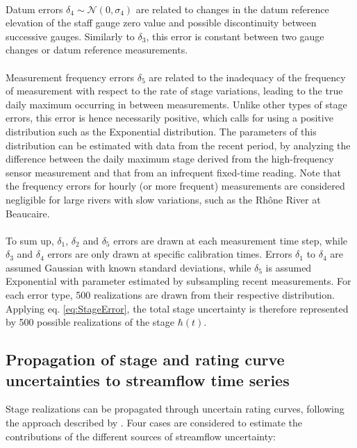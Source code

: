     \paragraph{}Datum errors $\delta_4  \sim \mathcal{N}(0,\sigma_4)$ are related to changes in the datum reference elevation of the staff gauge zero value and possible discontinuity between successive gauges. Similarly to $\delta_3$, this error is constant between two gauge changes or datum reference measurements. 
    
    \paragraph{}Measurement frequency errors $\delta_5$ are related to the inadequacy of the frequency of measurement with respect to the rate of stage variations, leading to the true daily maximum occurring in between measurements. Unlike other types of stage errors, this error is hence necessarily positive, which calls for using a positive distribution such as the Exponential distribution. The parameters of this distribution can be estimated with data from the recent period, by analyzing the difference between the daily maximum stage derived from the high-frequency sensor measurement and that from an infrequent fixed-time reading. Note that the frequency errors for hourly (or more frequent) measurements are considered negligible for large rivers with slow variations, such as the Rhône River at Beaucaire.
      
    \paragraph{}
    To sum up, $\delta_1$, $\delta_2$ and $\delta_5$ errors are drawn at each measurement time step, while $\delta_3$ and $\delta_4$ errors are only drawn at specific calibration times. Errors $\delta_1$ to $\delta_4$ are assumed Gaussian with known standard deviations, while $\delta_5$ is assumed Exponential with parameter estimated by subsampling recent measurements. For each error type, 500 realizations are drawn from their respective distribution. Applying eq. \ref{eq:StageError}, the total stage uncertainty is therefore represented by 500 possible realizations of the stage $\hbar(t)$.
   
   \subsection{Propagation of stage and rating curve uncertainties to streamflow time series}
   \label{subsec:PropagStage}
   Stage realizations can be propagated through uncertain rating curves, following the approach described by \citet{horner_impact_2018}. Four cases are considered to estimate the contributions of the different sources of streamflow uncertainty:
   
